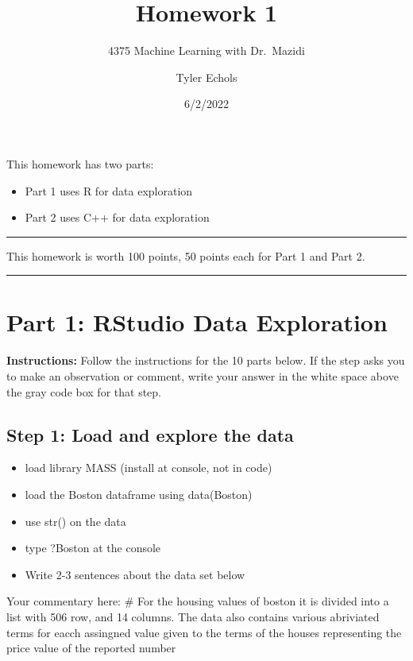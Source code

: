 \documentclass[
]{article}
\title{Homework 1}
\subtitle{4375 Machine Learning with Dr.~Mazidi}
\author{Tyler Echols}
\date{6/2/2022}
\providecommand{\tightlist}{%
  \setlength{\itemsep}{0pt}\setlength{\parskip}{0pt}}
\begin{document}
\maketitle

This homework has two parts:

\begin{itemize}
\tightlist
\item
  Part 1 uses R for data exploration
\item
  Part 2 uses C++ for data exploration
\end{itemize}

\begin{center}\rule{0.5\linewidth}{0.5pt}\end{center}

This homework is worth 100 points, 50 points each for Part 1 and Part 2.

\begin{center}\rule{0.5\linewidth}{0.5pt}\end{center}

\hypertarget{part-1-rstudio-data-exploration}{%
\section{Part 1: RStudio Data
Exploration}\label{part-1-rstudio-data-exploration}}

\textbf{Instructions:} Follow the instructions for the 10 parts below.
If the step asks you to make an observation or comment, write your
answer in the white space above the gray code box for that step.

\hypertarget{step-1-load-and-explore-the-data}{%
\subsection{Step 1: Load and explore the
data}\label{step-1-load-and-explore-the-data}}

\begin{itemize}
\tightlist
\item
  load library MASS (install at console, not in code)
\item
  load the Boston dataframe using data(Boston)
\item
  use str() on the data
\item
  type ?Boston at the console
\item
  Write 2-3 sentences about the data set below
\end{itemize}

Your commentary here: \# For the housing values of boston it is divided
into a list with 506 row, and 14 columns. The data also contains various
abriviated terms for eacch assingned value given to the terms of the
houses representing the price value of the reported number
\end{document}
